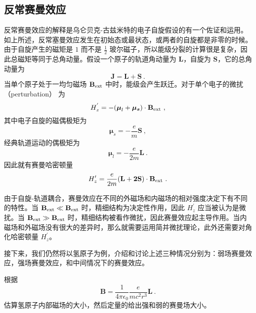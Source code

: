 \subsection{反常赛曼效应}
反常赛曼效应的解释是乌仑贝克-古兹米特的电子自旋假设的有一个佐证和运用。如上所述，反常塞曼效应发生在初始态或最状态，或两者的自旋都是非零的时候。由于自旋产生的磁矩是 $1$ 而不是 $\frac{1}{2}$ 玻尔磁子，所以能级分裂的计算很是复杂，因此总磁矩等同于总角动量。假设一个原子的轨道角动量为 $\mathbf{L}$，自旋为 $\mathbf{S}$，它的总角动量为
$$
\mathbf{J=L+S}~.
$$
当单个原子处于一均匀磁场 $\mathbf{B}_{\rm{ext}}$ 中时，能级会产生跃迁。对于单个电子的微扰（perturbation） 为
$$
H_z^{'} = -(\boldsymbol{\mu}_l+\boldsymbol{\mu_s})\cdot \mathbf{B}_{\rm{ext}}~,
$$
其中电子自旋的磁偶极矩为
$$\boldsymbol\mu _s =-\frac{e}{m}\mathbf{S}~,$$
经典轨道运动的偶极矩为
$$\boldsymbol\mu _l =-\frac{e}{2m}\mathbf{L}~.$$
因此就有赛曼哈密顿量
\begin{equation}\label{eq_ZemEff_5}
H_z' = \frac{e}{2m}(\mathbf{L+2S})\cdot \mathbf{B}_{\rm{ext}}~.
\end{equation}

由于自旋-轨道耦合，赛曼效应在不同的外磁场和内磁场的相对强度决定下有不同的特性。当 $\mathbf{B}_{\rm{ext}}\ll \mathbf{B}_{\rm{ext}}$ 时，精细结构为决定性作用，因此 $H_z^{'}$ 应当被认为是微扰。当 $\mathbf{B}_{\rm{ext}}\gg \mathbf{B}_{\rm{ext}}$ 时，精细结构被看作微扰，因此赛曼效应起主导作用。当内磁场和外磁场没有很大的差异时，那么就需要运用简并微扰理论，此外还需要对角化哈密顿量 $H_z^{'}$。

接下来，我们仍然将以氢原子为例，介绍和讨论上述三种情况分别为：弱场赛曼效应，强场赛曼效应，和中间情况下的赛曼效应。
\begin{exercise}{}
根据
\begin{equation}\label{eq_ZemEff_17}
\mathbf{B}=\frac{1}{4\pi\epsilon_0}\frac{e}{mc^2r^3}\mathbf{L}~.
\end{equation}
估算氢原子内部磁场的大小，然后定量的给出强和弱的赛曼场大小。
\end{exercise}

